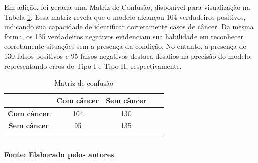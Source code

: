 Em adição, foi gerada uma Matriz de Confusão, disponível para visualização na Tabela \ref{tab:confusion}. Essa matriz revela que o modelo alcançou 104 verdadeiros positivos, indicando sua capacidade de identificar corretamente casos de câncer. Da mesma forma, os 135 verdadeiros negativos evidenciam sua habilidade em reconhecer corretamente situações sem a presença da condição. No entanto, a presença de 130 falsos positivos e 95 falsos negativos destaca desafios na precisão do modelo, representando erros do Tipo I e Tipo II, respectivamente.

\begin{table}[h]
  \centering
  \caption{Matriz de confusão}
   \label{tab:confusion}
   \vspace{-0.2cm}
\begin{tabular}{|c|c|c|c|c|} 
  \hline
     & \textbf{Com câncer} & \textbf{Sem câncer}  \\
  \hline
    \textbf{Com câncer} & 104 & 130 \\
  \hline
    \textbf{Sem câncer} & 95 & 135 \\
  \hline
\end{tabular}
	\vspace{0.2cm}
     \\\textbf{\footnotesize Fonte: Elaborado pelos autores}
\end{table}






